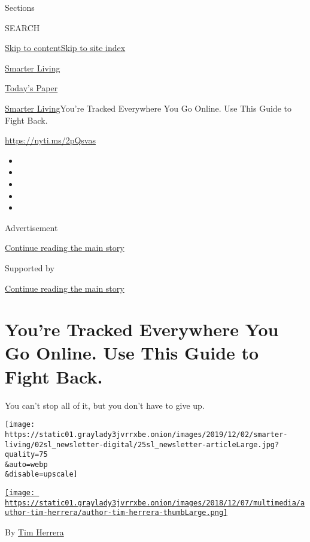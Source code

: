 Sections

SEARCH

\protect\hyperlink{site-content}{Skip to
content}\protect\hyperlink{site-index}{Skip to site index}

\href{https://www.nytimes3xbfgragh.onion/section/smarter-living}{Smarter
Living}

\href{https://myaccount.nytimes3xbfgragh.onion/auth/login?response_type=cookie\&client_id=vi}{}

\href{https://www.nytimes3xbfgragh.onion/section/todayspaper}{Today's
Paper}

\href{/section/smarter-living}{Smarter Living}\textbar{}You're Tracked
Everywhere You Go Online. Use This Guide to Fight Back.

\url{https://nyti.ms/2pQsvas}

\begin{itemize}
\item
\item
\item
\item
\item
\end{itemize}

Advertisement

\protect\hyperlink{after-top}{Continue reading the main story}

Supported by

\protect\hyperlink{after-sponsor}{Continue reading the main story}

\hypertarget{youre-tracked-everywhere-you-go-online-use-this-guide-to-fight-back}{%
\section{You're Tracked Everywhere You Go Online. Use This Guide to
Fight
Back.}\label{youre-tracked-everywhere-you-go-online-use-this-guide-to-fight-back}}

You can't stop all of it, but you don't have to give up.

\texttt{[image: https://static01.graylady3jvrrxbe.onion/images/2019/12/02/smarter-living/02sl\_newsletter-digital/25sl\_newsletter-articleLarge.jpg?quality=75\\\&auto=webp\\\&disable=upscale]}

\href{https://www.nytimes3xbfgragh.onion/by/tim-herrera}{\texttt{[image: https://static01.graylady3jvrrxbe.onion/images/2018/12/07/multimedia/author-tim-herrera/author-tim-herrera-thumbLarge.png]}}

By \href{https://www.nytimes3xbfgragh.onion/by/tim-herrera}{Tim Herrera}

